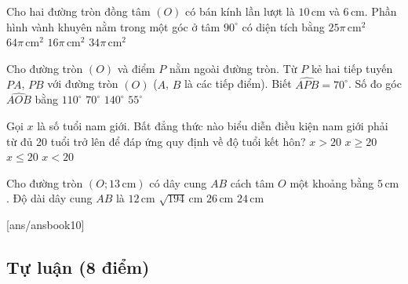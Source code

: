 \begin{ex}
Cho hai đường tròn đồng tâm $(O)$ có bán kính lần lượt là $10\,\text{cm}$ và $6\,\text{cm}$. Phần hình vành khuyên nằm trong một góc ở tâm $90^\circ$ có diện tích bằng
\choice
{$25\pi\,\text{cm}^2$}
{$64\pi\,\text{cm}^2$}
{\True $16\pi\,\text{cm}^2$}
{$34\pi\,\text{cm}^2$}
\end{ex}

\begin{ex}
Cho đường tròn $(O)$ và điểm $P$ nằm ngoài đường tròn. Từ $P$ kẻ hai tiếp tuyến $PA$, $PB$ với đường tròn $(O)$ ($A$, $B$ là các tiếp điểm). Biết $\widehat{APB}=70^\circ$. Số đo góc $\widehat{AOB}$ bằng
\choice
{\True $110^\circ$}
{$70^\circ$}
{$140^\circ$}
{$55^\circ$}
\end{ex}

\begin{ex}
Gọi $x$ là số tuổi nam giới. Bất đẳng thức nào biểu diễn điều kiện nam giới phải từ đủ 20 tuổi trở lên để đáp ứng quy định về độ tuổi kết hôn?
\choice
{$x>20$}
{\True $x\ge 20$}
{$x\le 20$}
{$x<20$}
\end{ex}

\begin{ex}
Cho đường tròn $(O;13\,\text{cm})$ có dây cung $AB$ cách tâm $O$ một khoảng bằng $5\,\text{cm}$. Độ dài dây cung $AB$ là
\choice
{$12\,\text{cm}$}
{$\sqrt{194}\,\text{cm}$}
{$26\,\text{cm}$}
{\True $24\,\text{cm}$}
\end{ex}

    
[ans/ansbook10]
\setcounter{bt}{0}
\subsection{Tự luận (8 điểm)}


